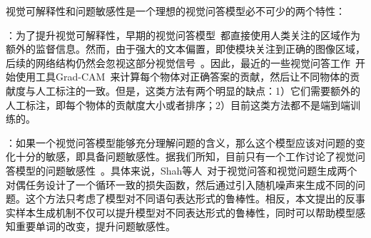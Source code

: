 视觉可解释性和问题敏感性是一个理想的视觉问答模型必不可少的两个特性：

\textbf{}：为了提升视觉可解释性，早期的视觉问答模型~\cite{qiao2018exploring,liu2017attention,zhang2019interpretable}都直接使用人类关注的区域作为额外的监督信息。然而，由于强大的文本偏置，即使模块关注到正确的图像区域，后续的网络结构仍然会忽视这部分视觉信号~\cite{selvaraju2019taking}。因此，最近的一些视觉问答工作~\cite{selvaraju2019taking,wu2019self}开始使用工具Grad-CAM~\cite{selvaraju2017grad}来计算每个物体对正确答案的贡献，然后让不同物体的贡献度与人工标注的一致。但是，这类方法有两个明显的缺点：1）它们需要额外的人工标注，即每个物体的贡献度大小或者排序；2）目前这类方法都不是端到端训练的。

\textbf{}：如果一个视觉问答模型能够充分理解问题的含义，那么这个模型应该对问题的变化十分的敏感，即具备问题敏感性。据我们所知，目前只有一个工作讨论了视觉问答模型的问题敏感性~\cite{shah2019cycle}。具体来说，Shah等人~\cite{shah2019cycle}对于视觉问答和视觉问题生成两个对偶任务设计了一个循环一致的损失函数，然后通过引入随机噪声来生成不同的问题。这个方法只考虑了模型对不同语句表达形式的鲁棒性。相反，本文提出的反事实样本生成机制不仅可以提升模型对不同表达形式的鲁棒性，同时可以帮助模型感知重要单词的改变，提升问题敏感性。

